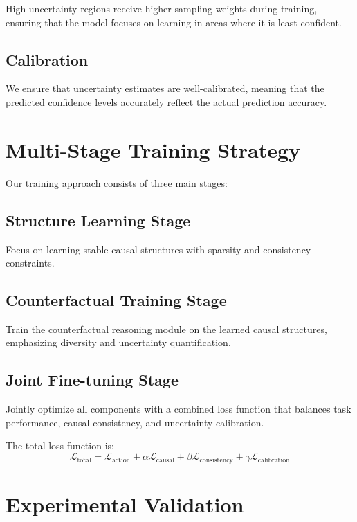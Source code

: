\documentclass[12pt]{article}
\begin{document}
High uncertainty regions receive higher sampling weights during training, ensuring that the model focuses on learning in areas where it is least confident.

\subsection{Calibration}

We ensure that uncertainty estimates are well-calibrated, meaning that the predicted confidence levels accurately reflect the actual prediction accuracy.

\section{Multi-Stage Training Strategy}

Our training approach consists of three main stages:

\subsection{Structure Learning Stage}
Focus on learning stable causal structures with sparsity and consistency constraints.

\subsection{Counterfactual Training Stage}
Train the counterfactual reasoning module on the learned causal structures, emphasizing diversity and uncertainty quantification.

\subsection{Joint Fine-tuning Stage}
Jointly optimize all components with a combined loss function that balances task performance, causal consistency, and uncertainty calibration.

The total loss function is:
\begin{equation}
\mathcal{L}_{\text{total}} = \mathcal{L}_{\text{action}} + \alpha \mathcal{L}_{\text{causal}} + \beta \mathcal{L}_{\text{consistency}} + \gamma \mathcal{L}_{\text{calibration}}
\end{equation}

\section{Experimental Validation}
\end{document}
